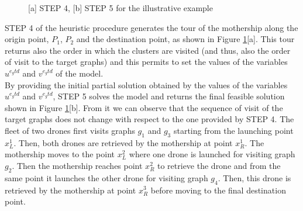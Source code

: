 \begin{figure}[h!]
    \centering
    \qquad
        \caption{[a] STEP 4, [b] STEP 5 for the illustrative example}%
    \label{fig:example4}%
\end{figure}

\noindent
STEP 4 of the heuristic procedure generates the tour of the mothership along the origin point, $P_1$, $P_2$ and the destination point, as shown in Figure \ref{fig:example4}[a]. This tour returns also the order in which the clusters are visited (and thus, also the order of visit to the target graphs) and this permits to set the values of the variables $u^{e_{g}td}$ and $v^{e_{g}td}$ of the \AMD\space model.\\
\noindent 
By providing the initial partial solution obtained by the values of the variables $u^{e_{g}td}$ and $v^{e_{g}td}$, STEP 5 solves the \AMD\space model and returns the final feasible solution shown in Figure \ref{fig:example4}[b]. From it we can observe that the sequence of visit of the target graphs does not change with respect to the one provided by STEP 4. The fleet of two drones first visits graphs $g_1$ and $g_3$ starting from the launching point $x^1_L$. Then, both drones are retrieved by the mothership at point $x^1_R$. The mothership moves to the point $x^2_L$  where one drone is launched for visiting graph $g_2$. Then the mothership reaches point $x^2_R$ to retrieve the drone and from the same point it launches the other drone for visiting graph $g_4$. Then, this drone is retrieved by the mothership at point $x^3_R$ before moving to the final destination point.


